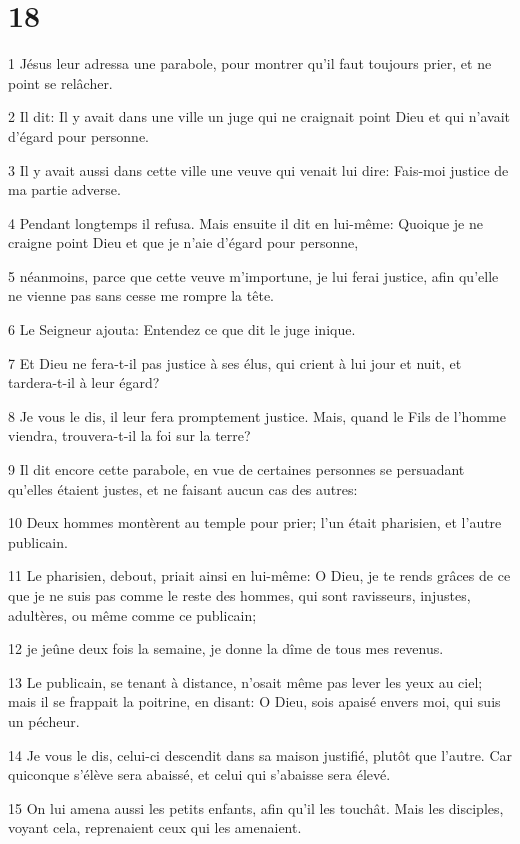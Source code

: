 \chapter{18}

\par 1 Jésus leur adressa une parabole, pour montrer qu'il faut toujours prier, et ne point se relâcher.
\par 2 Il dit: Il y avait dans une ville un juge qui ne craignait point Dieu et qui n'avait d'égard pour personne.
\par 3 Il y avait aussi dans cette ville une veuve qui venait lui dire: Fais-moi justice de ma partie adverse.
\par 4 Pendant longtemps il refusa. Mais ensuite il dit en lui-même: Quoique je ne craigne point Dieu et que je n'aie d'égard pour personne,
\par 5 néanmoins, parce que cette veuve m'importune, je lui ferai justice, afin qu'elle ne vienne pas sans cesse me rompre la tête.
\par 6 Le Seigneur ajouta: Entendez ce que dit le juge inique.
\par 7 Et Dieu ne fera-t-il pas justice à ses élus, qui crient à lui jour et nuit, et tardera-t-il à leur égard?
\par 8 Je vous le dis, il leur fera promptement justice. Mais, quand le Fils de l'homme viendra, trouvera-t-il la foi sur la terre?
\par 9 Il dit encore cette parabole, en vue de certaines personnes se persuadant qu'elles étaient justes, et ne faisant aucun cas des autres:
\par 10 Deux hommes montèrent au temple pour prier; l'un était pharisien, et l'autre publicain.
\par 11 Le pharisien, debout, priait ainsi en lui-même: O Dieu, je te rends grâces de ce que je ne suis pas comme le reste des hommes, qui sont ravisseurs, injustes, adultères, ou même comme ce publicain;
\par 12 je jeûne deux fois la semaine, je donne la dîme de tous mes revenus.
\par 13 Le publicain, se tenant à distance, n'osait même pas lever les yeux au ciel; mais il se frappait la poitrine, en disant: O Dieu, sois apaisé envers moi, qui suis un pécheur.
\par 14 Je vous le dis, celui-ci descendit dans sa maison justifié, plutôt que l'autre. Car quiconque s'élève sera abaissé, et celui qui s'abaisse sera élevé.
\par 15 On lui amena aussi les petits enfants, afin qu'il les touchât. Mais les disciples, voyant cela, reprenaient ceux qui les amenaient.
